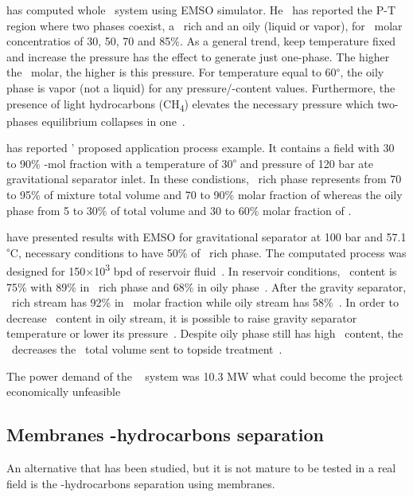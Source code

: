 \citet{deSouza2018} has computed whole \HiSep~system using EMSO simulator. He~\citep{deSouza2018} has reported the P-T region where two phases coexist, a \CO~rich and an oily (liquid or vapor), for \CO~molar concentratios of 30, 50, 70 and 85\%. As a general trend, keep temperature fixed and increase the pressure has the effect to generate just one-phase. The higher the \CO~molar, the higher is this pressure. For temperature equal to 60\textsuperscript{$\circ$}, the oily phase is vapor (not a liquid) for any pressure/\CO-content values. Furthermore, the presence of light hydrocarbons (CH\textsubscript{4}) elevates the necessary pressure which two-phases equilibrium collapses in one~\citep{deSouza2018}. 

\citet{deSouza2018} has reported \citet{Passarelli2017}' proposed application process example. It contains a field with 30 to 90\% \CO-mol fraction with a temperature of 30\textsuperscript{$\circ$} and pressure of 120 bar ate gravitational separator inlet. In these condistions, \CO~rich phase represents from 70 to 95\% of mixture total volume and 70 to 90\% molar fraction of \CO whereas the oily phase from 5 to 30\% of total volume and 30 to 60\% molar fraction of \CO.

\citet{deSouza2019} have presented results with EMSO for gravitational separator at 100 bar and 57.1 \textsuperscript{$\circ$}C, necessary conditions to have 50\% of \CO~rich phase. The computated process was designed for 150$\times$10\textsuperscript{3} bpd of reservoir fluid~\citep{deSouza2019}. In reservoir conditions, \CO~content is 75\% with 89\% in \CO~rich phase and 68\% in oily phase~\citep{deSouza2019}. After the gravity separator, \CO~rich stream has 92\% in \CO~molar fraction while oily stream has 58\%~\citep{deSouza2019}. In order to decrease \CO~content in oily stream, it is possible to raise gravity separator temperature or lower its pressure~\citep{deSouza2019}. Despite oily phase still has high \CO~content, the \HiSep~decreases the \CO~total volume sent to topside treatment~\citep{deSouza2018}.

The power demand of the \HiSep~ system was 10.3 MW what could become the project economically unfeasible~\citep{deSouza2018}

\subsection{Membranes \CO-hydrocarbons separation}
\label{sec:MembranesCo2Hydrocarbons}
An alternative that has been studied, but it is not mature to be tested in a real field is the \CO-hydrocarbons separation using membranes. 

